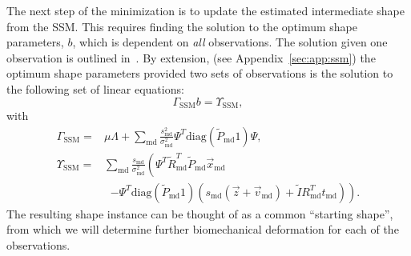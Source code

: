 \documentclass[journal]{IEEEtran}
\newcommand{\trans}[1]{#1^{\scriptscriptstyle T}}
\newcommand{\diag}{\mathrm{diag}}
\begin{document}
The next step of the minimization is to update the estimated intermediate shape from the SSM.  This requires finding the solution to the optimum shape parameters, $b$, which is dependent on \textit{all} observations.  The solution given one observation is outlined in~\cite{Rasoulian12b}. By extension, (see Appendix~\ref{sec:app:ssm}) the optimum shape parameters provided two sets of observations is the solution to the following set of linear equations:
\begin{equation} \label{eq:SSM1}
\Gamma_{\mathrm{SSM}}b = \Upsilon_\mathrm{SSM},
\end{equation}
with
\begin{align} \label{eq:SSM2}
\Gamma_{\mathrm{SSM}} = & \mu\Lambda + \sum_\mathrm{md}\frac{s^2_\mathrm{md}}{\sigma^2_\mathrm{md}}\trans{\Psi}\diag(\tilde{P}_\mathrm{md}1)\Psi,\\
 \Upsilon_{\mathrm{SSM}} = & \sum_{\mathrm{md}}\frac{s_\mathrm{md}}{\sigma^2_\mathrm{md}}\left(\trans{\Psi}\trans{\tilde{R}}_\mathrm{md}\tilde{P}_\mathrm{md}\vec{x}_\mathrm{md}\right.\nonumber\\
 & \;\; \left.-\trans{\Psi}\diag(\tilde{P}_\mathrm{md}1)\!\left(s_\mathrm{md}(\vec{z}+\vec{v}_\mathrm{md})+\tilde{I}\trans{R}_\mathrm{md}t_\mathrm{md}\right)\right)\nonumber.
\end{align}
The resulting shape instance can be thought of as a common ``starting shape'', from which we will determine further biomechanical deformation for each of the observations.
\end{document}
